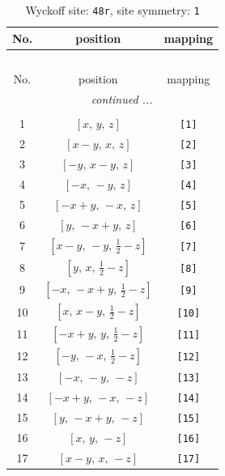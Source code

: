 \documentclass[fleqn,8pt]{jsarticle}
\begin{document}
\renewcommand{\arraystretch}{1.2}
\begin{longtable}{ccc}
\caption{Wyckoff site: {\tt 48r}, site symmetry: {\tt 1}}
 \\
 \hline \hline
No. & position & mapping \\ \hline \endfirsthead

\multicolumn{2}{l}{\tablename\ \thetable{}} \\
 \hline \hline
No. & position & mapping \\ \hline \endhead

 \hline \hline
\multicolumn{2}{r}{\footnotesize\it continued ...} \\ \endfoot

 \hline \hline
\multicolumn{2}{r}{} \\ \endlastfoot

1 & $\left[ x,\, y,\, z \right]$ & {\tt [1]} \\ \hline
2 & $\left[ x - y,\, x,\, z \right]$ & {\tt [2]} \\ \hline
3 & $\left[ - y,\, x - y,\, z \right]$ & {\tt [3]} \\ \hline
4 & $\left[ - x,\, - y,\, z \right]$ & {\tt [4]} \\ \hline
5 & $\left[ - x + y,\, - x,\, z \right]$ & {\tt [5]} \\ \hline
6 & $\left[ y,\, - x + y,\, z \right]$ & {\tt [6]} \\ \hline
7 & $\left[ x - y,\, - y,\, \frac{1}{2} - z \right]$ & {\tt [7]} \\ \hline
8 & $\left[ y,\, x,\, \frac{1}{2} - z \right]$ & {\tt [8]} \\ \hline
9 & $\left[ - x,\, - x + y,\, \frac{1}{2} - z \right]$ & {\tt [9]} \\ \hline
10 & $\left[ x,\, x - y,\, \frac{1}{2} - z \right]$ & {\tt [10]} \\ \hline
11 & $\left[ - x + y,\, y,\, \frac{1}{2} - z \right]$ & {\tt [11]} \\ \hline
12 & $\left[ - y,\, - x,\, \frac{1}{2} - z \right]$ & {\tt [12]} \\ \hline
13 & $\left[ - x,\, - y,\, - z \right]$ & {\tt [13]} \\ \hline
14 & $\left[ - x + y,\, - x,\, - z \right]$ & {\tt [14]} \\ \hline
15 & $\left[ y,\, - x + y,\, - z \right]$ & {\tt [15]} \\ \hline
16 & $\left[ x,\, y,\, - z \right]$ & {\tt [16]} \\ \hline
17 & $\left[ x - y,\, x,\, - z \right]$ & {\tt [17]} \\ \hline

\end{longtable}
\end{document}
